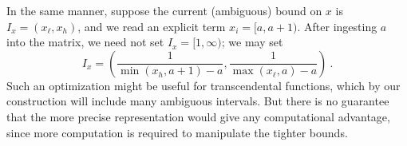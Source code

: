 \documentclass[11pt, oneside]{amsart}   	%
\renewcommand{\:}{\negthickspace:\negthickspace}
\begin{document}
In the same manner, suppose the current (ambiguous) bound on $x$ is $I_x = (x_{\ell}, x_{h})$, and we read an explicit term $x_i = [a,a+1)$. After ingesting $a$ into the matrix, we need not set $I_x = [1,\infty)$; we may set
\[
I_x = \left(\frac{1}{\min(x_h,a+1) - a}, \frac{1}{\max(x_{\ell},a) - a}\right) \ .
\]
Such an optimization might be useful for transcendental functions, which by our construction will include many ambiguous intervals. But there is no guarantee that the more precise representation would give any computational advantage, since more computation is required to manipulate the tighter bounds.





\end{document}
